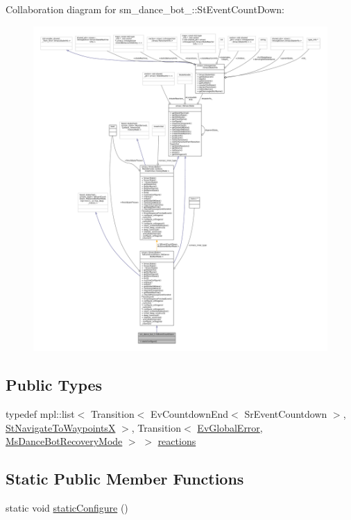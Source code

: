 Collaboration diagram for sm\+\_\+dance\+\_\+bot\+\_\+:\+:St\+Event\+Count\+Down\+:
\nopagebreak
\begin{figure}[H]
\begin{center}
\leavevmode
\includegraphics[width=350pt]{structsm__dance__bot__2_1_1StEventCountDown__coll__graph}
\end{center}
\end{figure}
\subsection*{Public Types}
\begin{DoxyCompactItemize}
\item 
typedef mpl\+::list$<$ Transition$<$ Ev\+Countdown\+End$<$ Sr\+Event\+Countdown $>$, \hyperlink{structsm__dance__bot__2_1_1StNavigateToWaypointsX}{St\+Navigate\+To\+WaypointsX} $>$, Transition$<$ \hyperlink{structsm__dance__bot__2_1_1EvGlobalError}{Ev\+Global\+Error}, \hyperlink{classsm__dance__bot__2_1_1MsDanceBotRecoveryMode}{Ms\+Dance\+Bot\+Recovery\+Mode} $>$ $>$ \hyperlink{structsm__dance__bot__2_1_1StEventCountDown_a8131a3f263da41baa539ec07a14a6f5f}{reactions}
\end{DoxyCompactItemize}
\subsection*{Static Public Member Functions}
\begin{DoxyCompactItemize}
\item 
static void \hyperlink{structsm__dance__bot__2_1_1StEventCountDown_af5c378d5ea5e77c6ed3bc5e8870e4bcc}{static\+Configure} ()
\end{DoxyCompactItemize}
